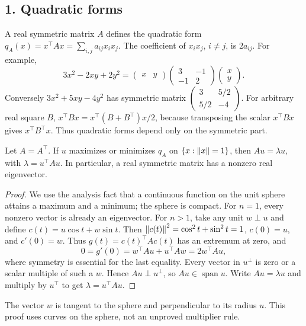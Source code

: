 \subsection*{1. Quadratic forms}
A real symmetric matrix \(A\) defines the quadratic form
\(q_A(x)=x^\top Ax=\sum_{i,j}a_{ij}x_ix_j\).
The coefficient of \(x_ix_j\), \(i\ne j\), is \(2a_{ij}\).
For example,
\[
 3x^2-2xy+2y^2
 =\begin{pmatrix}x&y\end{pmatrix}
  \begin{pmatrix}3&-1\\-1&2\end{pmatrix}
  \begin{pmatrix}x\\y\end{pmatrix}.
\]
Conversely \(3x^2+5xy-4y^2\) has symmetric matrix
\(\begin{pmatrix}3&5/2\\5/2&-4\end{pmatrix}\).
For arbitrary real square \(B\),
\(x^\top Bx=x^\top(B+B^\top)x/2\), because transposing the scalar
\(x^\top Bx\) gives \(x^\top B^\top x\). Thus quadratic forms depend
only on the symmetric part.

\begin{theorem}\label{thm:09:sphere}
Let \(A=A^\top\). If \(u\) maximizes or minimizes \(q_A\) on
\(\{x:\left\lVert x\right\rVert=1\}\), then \(Au=\lambda u\), with
\(\lambda=u^\top Au\). In particular, a real symmetric matrix has a
nonzero real eigenvector.
\end{theorem}
\begin{proof}
We use the analysis fact that a continuous function on the unit sphere
attains a maximum and a minimum; the sphere is compact.
For \(n=1\), every nonzero vector is already an eigenvector.
For \(n>1\), take any unit \(w\perp u\) and define
\(c(t)=u\cos t+w\sin t\).
Then
\(\left\lVert c(t)\right\rVert^2=\cos^2t+\sin^2t=1\), \(c(0)=u\), and \(c'(0)=w\).
Thus \(g(t)=c(t)^\top Ac(t)\) has an extremum at zero, and
\[
 0=g'(0)=w^\top Au+u^\top Aw=2w^\top Au,
\]
where symmetry is essential for the last equality.
Every vector in \(u^\perp\) is zero or a scalar multiple of such a \(w\).
Hence \(Au\perp u^\perp\), so \(Au\in\operatorname{span}u\).
Write \(Au=\lambda u\) and multiply by \(u^\top\) to get
\(\lambda=u^\top Au\).
\end{proof}
The vector \(w\) is tangent to the sphere and perpendicular to its radius
\(u\). This proof uses curves on the sphere, not an unproved multiplier rule.

